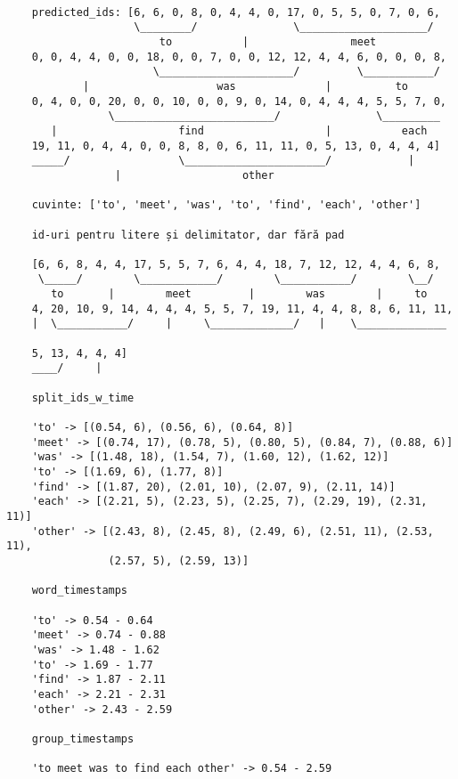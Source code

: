 \begin{verbatim}
    
    predicted_ids: [6, 6, 0, 8, 0, 4, 4, 0, 17, 0, 5, 5, 0, 7, 0, 6,
                    \________/               \____________________/
                        to           |                meet
    0, 0, 4, 4, 0, 0, 18, 0, 0, 7, 0, 0, 12, 12, 4, 4, 6, 0, 0, 0, 8,
                       \_____________________/         \___________/
            |                    was              |          to           
    0, 4, 0, 0, 20, 0, 0, 10, 0, 0, 9, 0, 14, 0, 4, 4, 4, 5, 5, 7, 0,
                \_________________________/               \_________    
       |                   find                   |           each        
    19, 11, 0, 4, 4, 0, 0, 8, 8, 0, 6, 11, 11, 0, 5, 13, 0, 4, 4, 4]
    _____/                 \______________________/            |
                 |                   other

    cuvinte: ['to', 'meet', 'was', 'to', 'find', 'each', 'other']

    id-uri pentru litere și delimitator, dar fără pad

    [6, 6, 8, 4, 4, 17, 5, 5, 7, 6, 4, 4, 18, 7, 12, 12, 4, 4, 6, 8,
     \_____/        \____________/        \___________/        \__/
       to       |        meet         |        was        |     to
    4, 20, 10, 9, 14, 4, 4, 4, 5, 5, 7, 19, 11, 4, 4, 8, 8, 6, 11, 11,
    |  \___________/     |     \_____________/   |    \______________

    5, 13, 4, 4, 4]
    ____/     |

    split_ids_w_time

    'to' -> [(0.54, 6), (0.56, 6), (0.64, 8)]
    'meet' -> [(0.74, 17), (0.78, 5), (0.80, 5), (0.84, 7), (0.88, 6)]
    'was' -> [(1.48, 18), (1.54, 7), (1.60, 12), (1.62, 12)]
    'to' -> [(1.69, 6), (1.77, 8)]
    'find' -> [(1.87, 20), (2.01, 10), (2.07, 9), (2.11, 14)]
    'each' -> [(2.21, 5), (2.23, 5), (2.25, 7), (2.29, 19), (2.31, 11)]
    'other' -> [(2.43, 8), (2.45, 8), (2.49, 6), (2.51, 11), (2.53, 11),
                (2.57, 5), (2.59, 13)]

    word_timestamps

    'to' -> 0.54 - 0.64
    'meet' -> 0.74 - 0.88
    'was' -> 1.48 - 1.62
    'to' -> 1.69 - 1.77
    'find' -> 1.87 - 2.11
    'each' -> 2.21 - 2.31
    'other' -> 2.43 - 2.59

    group_timestamps

    'to meet was to find each other' -> 0.54 - 2.59
\end{verbatim}

